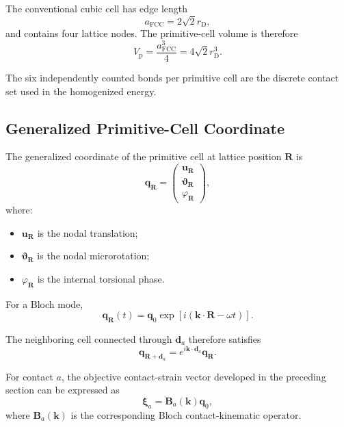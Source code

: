 The conventional cubic cell has edge length
\begin{equation}
    a_{\mathrm{FCC}} = 2\sqrt{2}r_{\mathrm{D}},
\end{equation}
and contains four lattice nodes. The primitive-cell volume is therefore
\begin{equation}
    \boxed{ V_{\mathrm{p}} = \frac{a_{\mathrm{FCC}}^3}{4} = 4\sqrt{2}r_{\mathrm{D}}^3 }.
\end{equation}

The six independently counted bonds per primitive cell are the discrete contact set used in the homogenized energy.

\subsection{Generalized Primitive-Cell Coordinate}

The generalized coordinate of the primitive cell at lattice position $\mathbf{R}$ is
\begin{equation}
    \mathbf{q}_{\mathbf{R}} =
    \begin{pmatrix}
        \mathbf{u}_{\mathbf{R}} \\
        \boldsymbol{\vartheta}_{\mathbf{R}} \\
        \varphi_{\mathbf{R}}
    \end{pmatrix},
\end{equation}
where:
\begin{itemize}
    \item $\mathbf{u}_{\mathbf{R}}$ is the nodal translation;
    \item $\boldsymbol{\vartheta}_{\mathbf{R}}$ is the nodal microrotation;
    \item $\varphi_{\mathbf{R}}$ is the internal torsional phase.
\end{itemize}

For a Bloch mode,
\begin{equation}
    \mathbf{q}_{\mathbf{R}}(t) = \mathbf{q}_0 \exp \left[ i \left( \mathbf{k}\cdot\mathbf{R}-\omega t \right) \right].
\end{equation}

The neighboring cell connected through $\mathbf{d}_a$ therefore satisfies
\begin{equation}
    \mathbf{q}_{\mathbf{R}+\mathbf{d}_a} = e^{i\mathbf{k}\cdot\mathbf{d}_a} \mathbf{q}_{\mathbf{R}}.
\end{equation}

For contact $a$, the objective contact-strain vector developed in the preceding section can be expressed as
\begin{equation}
    \boldsymbol{\xi}_a = \mathbf{B}_a(\mathbf{k})\mathbf{q}_0,
\end{equation}
where $\mathbf{B}_a(\mathbf{k})$ is the corresponding Bloch contact-kinematic operator.

